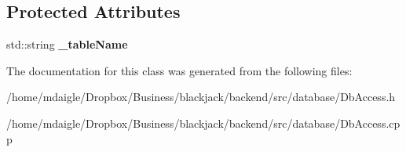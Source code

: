 \subsection*{\-Protected \-Attributes}
\begin{DoxyCompactItemize}
\item 
\hypertarget{classDbAccess_a2338af02e8b05db6da74164252b7deae}{
std\-::string {\bfseries \-\_\-table\-Name}}
\label{classDbAccess_a2338af02e8b05db6da74164252b7deae}

\end{DoxyCompactItemize}


\-The documentation for this class was generated from the following files\-:\begin{DoxyCompactItemize}
\item 
/home/mdaigle/\-Dropbox/\-Business/blackjack/backend/src/database/\-Db\-Access.\-h\item 
/home/mdaigle/\-Dropbox/\-Business/blackjack/backend/src/database/\-Db\-Access.\-cpp\end{DoxyCompactItemize}
